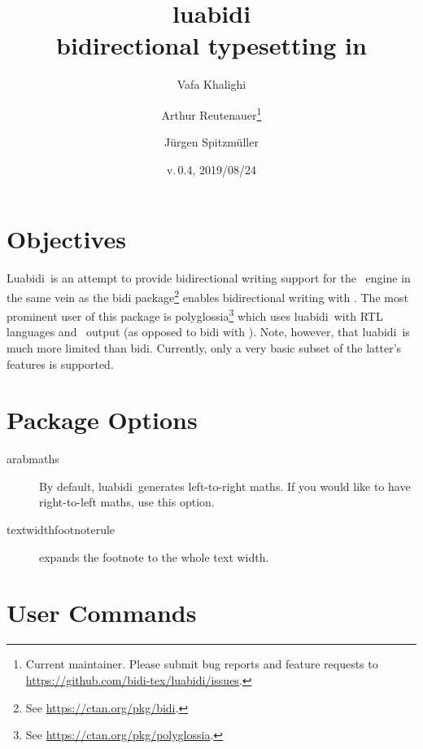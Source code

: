 \documentclass{article}
\newcommand*\lbd{\textsf{luabidi}}
\newcommand*\Lbd{\textsf{Luabidi}}
\def\fileversion{0.4}
\def\filedate{2019/08/24}
\begin{document}
	
\title{\lbd\\bidirectional typesetting in \LuaTeX}

\date{v.\,\fileversion, \filedate}

\author{Vafa Khalighi \and Arthur Reutenauer\thanks{%
		Current maintainer. Please submit bug reports and feature requests to \protect\url{https://github.com/bidi-tex/luabidi/issues}.}
	    \and Jürgen Spitzmüller}

\maketitle

\section{Objectives}
\Lbd\ is an attempt to provide bidirectional writing support for the \LuaTeX\ engine in the same vein as the \textsf{bidi} package\footnote{%
See \url{https://ctan.org/pkg/bidi}.} enables bidirectional writing with \XeTeX. The most prominent user of this package is \textsf{polyglossia}\footnote{%
See \url{https://ctan.org/pkg/polyglossia}.} which uses \lbd\ with RTL languages and \LuaTeX\ output (as opposed to \textsf{bidi} with \XeTeX). Note, however, that \lbd\ is much more limited than \textsf{bidi}. Currently, only a very basic
subset of the latter's features is supported.

\section{Package Options}

\begin{description}
	\item[arabmaths] By default, \lbd\ generates left-to-right maths. If you would like to have right-to-left maths, use this option.
	\item[textwidthfootnoterule] expands the footnote to the whole text width.
\end{description}

\section{User Commands}
\end{document}
